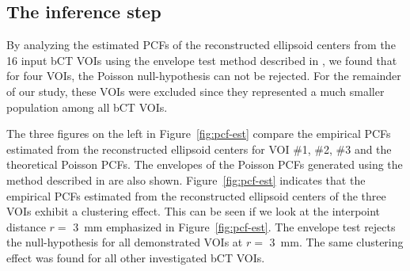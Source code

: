 \documentclass[journal]{IEEEtran}
\begin{document}
\subsection{The inference step}
\label{sec:inference-step}

By analyzing the estimated PCFs of the reconstructed ellipsoid centers
from the 16 input bCT VOIs using the envelope test method described in
\cite{baddeley2014tests}, we found that for four VOIs, the Poisson
null-hypothesis can not be rejected. For the remainder of our study,
these VOIs were excluded since they represented a much smaller
population among all bCT VOIs.

The three figures on the left in Figure~\ref{fig:pcf-est} compare the
empirical PCFs estimated from the reconstructed ellipsoid centers for
VOI \#1, \#2, \#3 and the theoretical Poisson PCFs. The envelopes of
the Poisson PCFs generated using the method described in
\cite{baddeley2014tests} are also shown. Figure~\ref{fig:pcf-est}
indicates that the empirical PCFs estimated from the reconstructed
ellipsoid centers of the three VOIs exhibit a clustering effect. This
can be seen if we look at the interpoint distance $r = $ \SI{3}{\mm}
emphasized in Figure~\ref{fig:pcf-est}. The envelope test rejects the
null-hypothesis for all demonstrated VOIs at $r = $ \SI{3}{\mm}. The
same clustering effect was found for all other investigated bCT VOIs.
\end{document}
